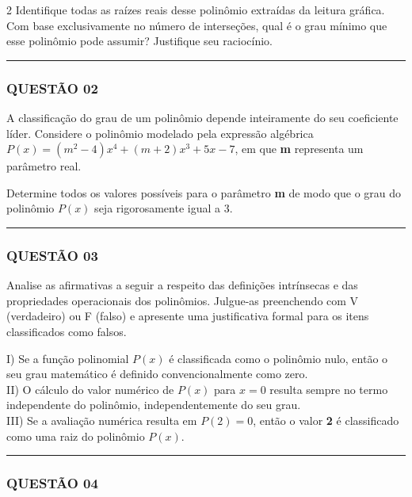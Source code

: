 \documentclass[twoside, 10pt, a4paper]{article}
\begin{document}
\begin{multicols*}{2}
Identifique todas as raízes reais desse polinômio extraídas da leitura gráfica. Com base exclusivamente no número de interseções, qual é o grau mínimo que esse polinômio pode assumir? Justifique seu raciocínio.

\vspace{0cm} \noindent\textcolor{CorLinha}{\rule{\linewidth}{0.5pt}} \vspace{-0.2cm}
\subsubsection*{QUESTÃO 02}

A classificação do grau de um polinômio depende inteiramente do seu coeficiente líder. Considere o polinômio modelado pela expressão algébrica $ P(x) = (m^2 - 4)x^4 + (m + 2)x^3 + 5x - 7 $, em que \textbf{m} representa um parâmetro real.

Determine todos os valores possíveis para o parâmetro \textbf{m} de modo que o grau do polinômio $ P(x) $ seja rigorosamente igual a 3.

\vspace{0cm} \noindent\textcolor{CorLinha}{\rule{\linewidth}{0.5pt}} \vspace{-0.2cm}
\subsubsection*{QUESTÃO 03}

Analise as afirmativas a seguir a respeito das definições intrínsecas e das propriedades operacionais dos polinômios. Julgue-as preenchendo com V (verdadeiro) ou F (falso) e apresente uma justificativa formal para os itens classificados como falsos.

I) Se a função polinomial $ P(x) $ é classificada como o polinômio nulo, então o seu grau matemático é definido convencionalmente como zero.\\[0.3cm]
II) O cálculo do valor numérico de $ P(x) $ para $ x = 0 $ resulta sempre no termo independente do polinômio, independentemente do seu grau.\\[0.3cm]
III) Se a avaliação numérica resulta em $ P(2) = 0 $, então o valor \textbf{2} é classificado como uma raiz do polinômio $ P(x) $.

\vspace{0cm} \noindent\textcolor{CorLinha}{\rule{\linewidth}{0.5pt}} \vspace{-0.2cm}
\subsubsection*{QUESTÃO 04}


\end{multicols*}
\end{document}
